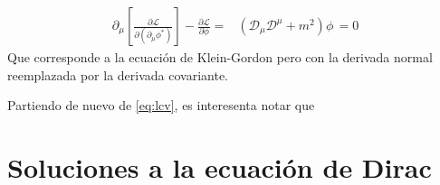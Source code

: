 \begin{align}
  \partial_{\mu} \left[ \frac{\partial \mathcal{L}}{\partial \left( \partial_{\mu}\phi^{*} \right)} \right]-\frac{\partial \mathcal{L}}{\partial \phi}=&
 \left(\mathcal{D}_{\mu}\mathcal{D}^{\mu}+m^2  \right)\phi\,=0
\end{align}
Que corresponde a la ecuación de Klein-Gordon pero con la derivada normal reemplazada por la derivada covariante.

Partiendo de nuevo de \ref{eq:lcv}, es interesenta notar que



\section{Soluciones a la ecuaci\'on de Dirac}
\label{sec:soluc-la-ecuac}

